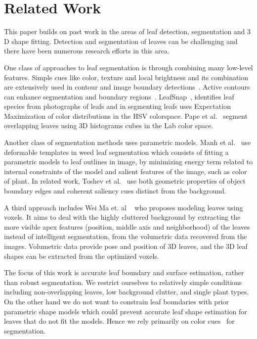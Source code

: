 \section{Related Work}
\label{sec:related}


This paper builds on past work in the areas of leaf detection, segmentation and $3$D shape fitting.   Detection and segmentation of leaves can be challenging and there have been numerous research efforts in this area.

One class of approaches to leaf segmentation is through combining many low-level features.  Simple cues like color, texture and local brightness and its combination are extensively used in contour and image boundary detections~\cite{martin2004learning,valliammal2012leaf}.  Active contours can enhance segmentation and boundary regions~\cite{mishra2011decoupled}. LeafSnap~\cite{kumar2012leafsnap}, identifies leaf species from photographs of leafs and in segmenting leafs uses Expectation Maximization of color distributions in the HSV colorspace.  Pape et al.~\cite{Pape2015} segment overlapping leaves using 3D histograms cubes in the Lab color space.

Another class of segmentation methods uses parametric models.  Manh et al.~\cite{Manh2001139} use deformable templates in weed leaf segmentation which consists of fitting a parametric models to leaf outlines in image, by minimizing energy term related to internal constraints of the model and salient features of the image, such as color of plant. In related work, Toshev et al.~\cite{toshev2012shape} use both geometric properties of object boundary edges and coherent saliency cues distinct from the background. 

A third approach includes Wei Ma et. al ~\cite{ma2008image} who proposes modeling leaves using voxels. It aims to deal with the highly cluttered background by extracting the more visible apex features (position, middle axis and neighborhood) of the leaves instead of intelligent segmentation, from the volumetric data recovered from the images.  Volumetric data provide pose and position of $3$D leaves, and the $3$D leaf shapes can be extracted from the optimized voxels.

The focus of this work is accurate leaf boundary and surface estimation, rather than robust segmentation.  We restrict ourselves to relatively simple conditions including non-overlapping leaves, low background clutter, and single plant types.    On the other hand we do not want to constrain leaf boundaries with prior parametric shape models which could prevent accurate leaf shape estimation for leaves that do not fit the models. Hence we rely primarily on color cues~\cite{achanta2012slic} for segmentation.


